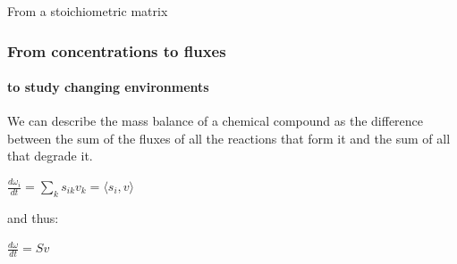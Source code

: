 \documentclass{beamer}
\begin{document}
\begin{frame}{From a stoichiometric matrix}
\begin{singlespace}
      \end{singlespace}      
   \end{frame}

   \begin{frame}
      \frametitle{From concentrations to fluxes}
      \framesubtitle{to study changing environments}

      We can describe the mass balance of a chemical compound as the difference between the sum of the 
      fluxes of all the reactions that form it and the sum of all that degrade it. 

      \bigskip 

      $\frac {d\omega_i}{dt} = \sum \limits_{k} s_{ik} v_k =  \langle  s_{i} , v \rangle  $

      \bigskip

      and thus:

      \bigskip 

      $\frac {d\omega}{dt} = Sv$

   \end{frame}
\end{document}
